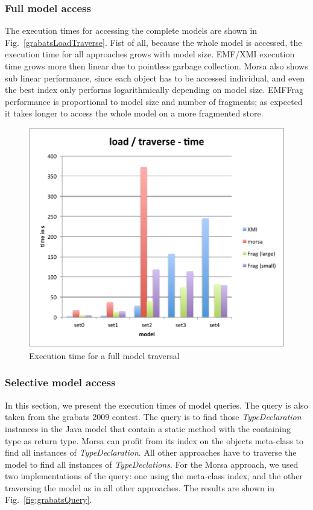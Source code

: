\subsubsection*{Full model access}

The execution times for accessing the complete models are shown in Fig.~\ref{grabatsLoadTraverse}. Fist of all,  because the whole model is accessed, the execution time for all approaches grows with model size. EMF/XMI execution time grows more then linear due to pointless garbage collection. Morsa also shows sub linear performance, since each object has to be accessed individual, and even the best index only performs logarithmically depending on model size. EMFFrag performance is proportional to model size and number of fragments; as expected it takes longer to access the whole model on a more fragmented store.

\begin{figure}
  \centering
  \includegraphics[width=0.65\linewidth]{figures/grabatsLoadTraverse}
  \caption{Execution time for a full model traversal}
  \label{fig:grabatsLoadTraverse}
\end{figure}

\subsubsection*{Selective model access}

In this section, we present the execution times of model queries. The query is also taken from the grabats 2009 contest. The query is to find those \emph{TypeDeclaration} instances in the Java model that contain a static method with the containing type as return type. Morsa can profit from its index on the objects meta-class to find all instances of \emph{TypeDeclaration}. All other approaches have to traverse the model to find all instances of \emph{TypeDeclations}. For the Morsa approach, we used two implementations of the query: one using the meta-class index, and the other traversing the model as in all other approaches. The results are shown in Fig.~\ref{fig:grabatsQuery}.

